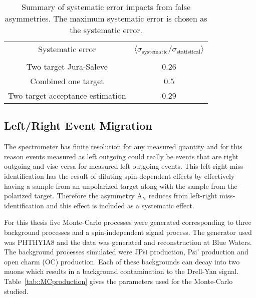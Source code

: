 \begin{table}[h!t]
  \centering
  \begin{tabular}{|c|c|}
    \hline Systematic error& \multirow{2}{9em}{$\langle
      \sigma_{\mathrm{systematic}}/\sigma_{\mathrm{statistical}}
      \rangle$}\\ & \\ \hline
    
    Two target Jura-Saleve& 0.26\\ \hline

    Combined one target& 0.5\\ \hline

    Two target acceptance estimation& 0.29\\ \hline
    
  \end{tabular}
  \caption{Summary of systematic error impacts from false asymmetries.  The
    maximum systematic error is chosen as the systematic error.}
  \label{tab::faSys}
\end{table}


\subsection{Left/Right Event Migration}
The spectrometer has finite resolution for any measured quantity and for this
reason events measured as left outgoing could really be events that are right
outgoing and vise versa for measured left outgoing events.  This left-right
miss-identification has the result of diluting spin-dependent effects by
effectively having a sample from an unpolarized target along with the sample
from the polarized target.  Therefore the asymmetry A$_{\mathrm{N}}$ reduces
from left-right miss-identification and this effect is included as a systematic
effect. \par

For this thesis five Monte-Carlo processes were generated corresponding to three
background processes and a spin-independent signal process.  The generator used
was PHTHYIA8 and the data was generated and reconstruction at Blue Waters.  The
background processes simulated were JPsi production, Psi' production and open
charm (OC) production.  Each of these backgrounds can decay into two muons which
results in a background contamination to the Drell-Yan signal.
Table~\ref{tab::MCproduction} gives the parameters used for the Monte-Carlo
studied.

